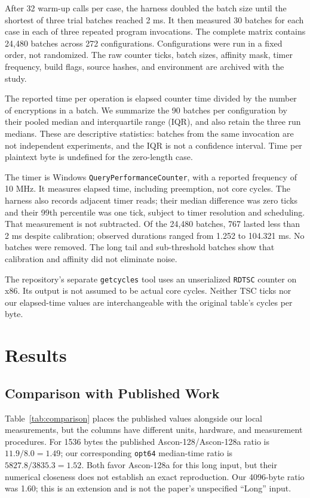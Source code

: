 \documentclass[conference]{IEEEtran}
\begin{document}
After 32 warm-up calls per case, the harness doubled the batch size until the
shortest of three trial batches reached 2 ms. It then measured 30 batches for
each case in each of three repeated program invocations. The complete matrix
contains 24,480 batches across 272 configurations. Configurations were run in
a fixed order, not randomized. The raw counter ticks, batch sizes, affinity
mask, timer frequency, build flags, source hashes, and environment are
archived with the study.

The reported time per operation is elapsed counter time divided by the number
of encryptions in a batch. We summarize the 90 batches per configuration by
their pooled median and interquartile range (IQR), and also retain the three
run medians. These are descriptive statistics: batches from the same
invocation are not independent experiments, and the IQR is not a confidence
interval. Time per plaintext byte is undefined for the zero-length case.

The timer is Windows \texttt{QueryPerformanceCounter}, with a reported
frequency of 10 MHz. It measures elapsed time, including preemption, not core
cycles. The harness also records adjacent timer reads; their median difference
was zero ticks and their 99th percentile was one tick, subject to timer
resolution and scheduling. That measurement is not subtracted. Of the 24,480
batches, 767 lasted less than 2 ms despite calibration; observed durations
ranged from 1.252 to 104.321 ms. No batches were removed. The long tail and
sub-threshold batches show that calibration and affinity did not eliminate
noise.

The repository's separate \texttt{getcycles} tool uses an unserialized
\texttt{RDTSC} counter on x86. Its output is not assumed to be actual core
cycles. Neither TSC ticks nor our elapsed-time values are interchangeable with
the original table's cycles per byte.

\section{Results}
\subsection{Comparison with Published Work}
Table~\ref{tab:comparison} places the published values alongside our local
measurements, but the columns have different units, hardware, and measurement
procedures. For 1536 bytes the published Ascon-128/Ascon-128a ratio is
$11.9/8.0 = 1.49$; our corresponding \texttt{opt64} median-time ratio is
$5827.8/3835.3 = 1.52$. Both favor Ascon-128a for this long input, but their
numerical closeness does not establish an exact reproduction. Our 4096-byte
ratio was 1.60; this is an extension and is not the paper's unspecified
``Long'' input.
\end{document}

